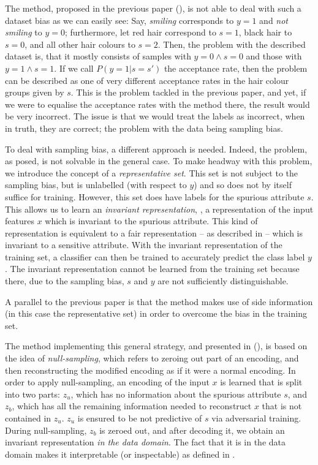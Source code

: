 The method, proposed in the previous paper (),
is not able to deal with such a dataset bias as we can easily see:
Say, \emph{smiling} corresponds to \(y=1\) and \emph{not smiling} to \(y=0\);
furthermore, let red hair correspond to \(s=1\), black hair to \(s=0\), and all other hair colours to \(s=2\).
Then, the problem with the described dataset is, that it mostly consists of samples with \(y=0\wedge s=0\)
and those with \(y=1\wedge s=1\).
If we call \(P(y=1|s=s')\) the acceptance rate,
then the problem can be described as one of very different acceptance rates in the hair colour groups given by \(s\).
This is the problem tackled in the previous paper,
and yet, if we were to equalise the acceptance rates with the method there,
the result would be very incorrect.
The issue is that we would treat the labels as incorrect, when in truth, they are correct;
the problem with the data being sampling bias.

To deal with sampling bias, a different approach is needed.
Indeed, the problem, as posed, is not solvable in the general case.
To make headway with this problem, we introduce the concept of a \emph{representative set}.
This set is not subject to the sampling bias,
but is unlabelled (with respect to $y$) and so does not by itself suffice for training.
However, this set does have labels for the spurious attribute \(s\).
This allows us to learn an \emph{invariant representation},
\ie, a representation of the input features \(x\) which is invariant to the spurious attribute.
This kind of representation is equivalent to a fair representation -- as described in  --
which is invariant to a sensitive attribute.
With the invariant representation of the training set,
a classifier can then be trained to accurately predict the class label \(y\).
The invariant representation cannot be learned from the training set
because there, due to the sampling bias, \(s\) and \(y\) are not sufficiently distinguishable.

A parallel to the previous paper is that the method makes use of side information
(in this case the representative set)
in order to overcome the bias in the training set.

The method implementing this general strategy, and presented in \citet{kehrenberg2020nullsampling} (),
is based on the idea of \emph{null-sampling},
which refers to zeroing out part of an encoding,
and then reconstructing the modified encoding as if it were a normal encoding.
In order to apply null-sampling, an encoding of the input \(x\) is learned that is split into two parts:
\(z_u\), which has no information about the spurious attribute \(s\),
and \(z_b\), which has all the remaining information needed to reconstruct \(x\) that is not contained in \(z_u\).
\(z_u\) is ensured to be not predictive of \(s\) via adversarial training.
During null-sampling, \(z_b\) is zeroed out, and after decoding it,
we obtain an invariant representation \emph{in the data domain}.
The fact that it is in the data domain makes it interpretable (or inspectable)
as defined in .

